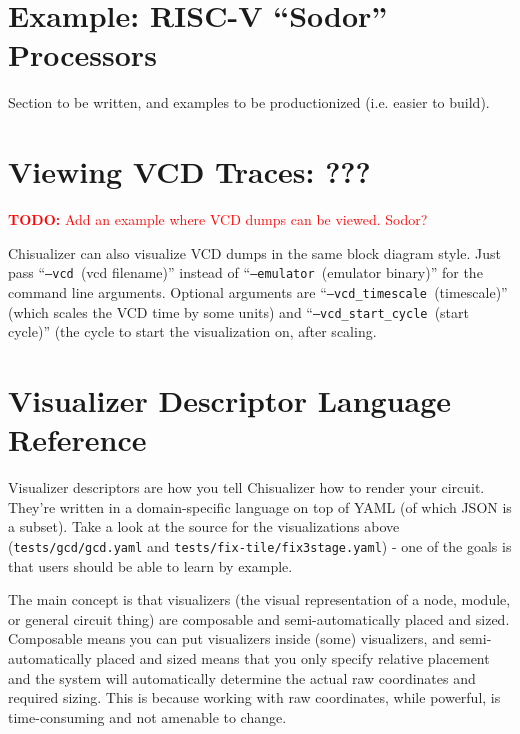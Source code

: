 \documentclass[11pt]{article}
\newcommand{\todo}[1]{\textcolor{red}{\textbf{TODO:} #1}}
\begin{document}
\section{Example: RISC-V ``Sodor'' Processors}
Section to be written, and examples to be productionized (i.e. easier to build).

\section{Viewing VCD Traces: ???}
\todo{Add an example where VCD dumps can be viewed. Sodor?}

Chisualizer can also visualize VCD dumps in the same block diagram style. Just pass ``\texttt{--vcd }(vcd filename)'' instead of ``\texttt{--emulator }(emulator binary)'' for the command line arguments. Optional arguments are ``\texttt{--vcd\_timescale }(timescale)'' (which scales the VCD time by some units) and ``\texttt{--vcd\_start\_cycle }(start cycle)'' (the cycle to start the visualization on, after scaling.

\section{Visualizer Descriptor Language Reference}
Visualizer descriptors are how you tell Chisualizer how to render your circuit. They're written in a domain-specific language on top of YAML (of which JSON is a subset). Take a look at the source for the visualizations above (\texttt{tests/gcd/gcd.yaml} and \texttt{tests/fix-tile/fix3stage.yaml}) - one of the goals is that users should be able to learn by example.

The main concept is that visualizers (the visual representation of a node, module, or general circuit thing) are composable and semi-automatically placed and sized. Composable means you can put visualizers inside (some) visualizers, and semi-automatically placed and sized means that you only specify relative placement and the system will automatically determine the actual raw coordinates and required sizing. This is because working with raw coordinates, while powerful, is time-consuming and not amenable to change.
\end{document}
